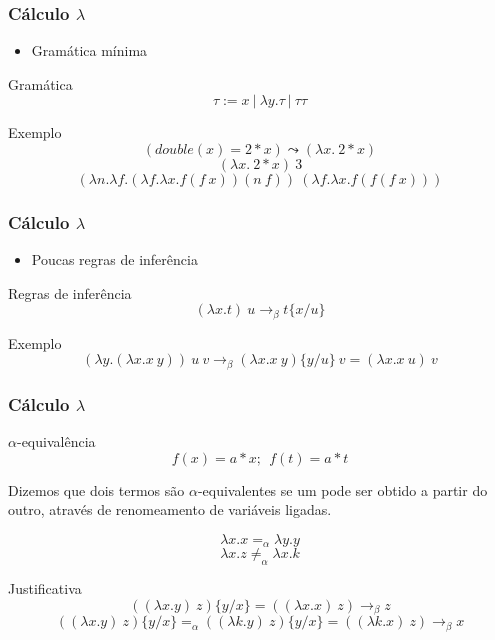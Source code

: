 \documentclass{beamer}
\begin{document}
\begin{frame}
\frametitle{Cálculo $\lambda$}

\begin{itemize}
\item Gramática mínima 
\end{itemize}

\begin{block}{Gramática}
\[ \tau := x\ |\ \lambda y.\tau\ |\ \tau \tau \]
\end{block}

\begin{block}{Exemplo}
    \[ (double(x) = 2*x) \leadsto (\lambda x.\ 2*x) \]
    \[ (\lambda x.\ 2*x)\ 3 \]
    \[ (\lambda n. \lambda f. (\lambda f. \lambda x.f (f\ x)) (n\ f))\ 
        (\lambda f. \lambda x. f (f (f\ x))) \]
\end{block}

\end{frame}


\begin{frame}
\frametitle{Cálculo $\lambda$}

\begin{itemize}
\item Poucas regras de inferência
\end{itemize}

\begin{block}{Regras de inferência}
\[ (\lambda x.t)\ u \rightarrow_{\beta} t\{x/u\} \]
\end{block}

\pause

\begin{block}{Exemplo}
\[ (\lambda y .(\lambda x.x\ y))\ u\ v \rightarrow_{\beta} (\lambda x.x\ y)\{y/u\}\ v = (\lambda x.x\ u)\ v \]
\end{block}

\end{frame}


\begin{frame}
\frametitle{Cálculo $\lambda$}

\begin{block}{ $\alpha$-equivalência }
    \[ f(x) = a*x;\ \ f(t) = a*t \]

    Dizemos que dois termos são $\alpha$-equivalentes se um pode ser obtido a
    partir do outro, através de renomeamento de variáveis ligadas.

    \[ \lambda x. x =_{\alpha} \lambda y. y \] 
    \[ \lambda x. z \neq_{\alpha} \lambda x. k \] 
    
\end{block}

\pause

\begin{block}{Justificativa}
    \[ ((\lambda x. y)\ z)\{y/x\} = ((\lambda x. x)\ z) \rightarrow_{\beta} z \] 
    \[ ((\lambda x. y)\ z)\{y/x\} =_{\alpha} ((\lambda k. y)\ z)\{y/x\} = ((\lambda k. x)\ z) \rightarrow_{\beta} x \] 
\end{block}
    
\end{frame}
\end{document}
